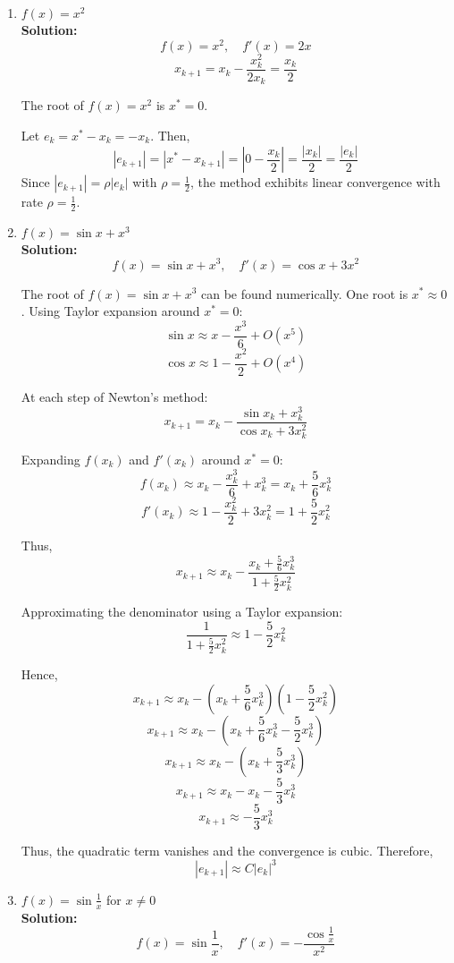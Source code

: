 \documentclass[11pt,onecolumn]{article}
\begin{document}
\begin{enumerate}[label=(\alph*)]
\item $f(x) = x^2$\\
\textbf{Solution:} 
\[
f(x) = x^2, \quad f'(x) = 2x
\]
\[
x_{k+1} = x_k - \frac{x_k^2}{2x_k} = \frac{x_k}{2}
\]

The root of \( f(x) = x^2 \) is \( x^* = 0 \).

Let \( e_k = x^* - x_k = -x_k \). Then,
\[
|e_{k+1}| = \left| x^* - x_{k+1} \right| = \left| 0 - \frac{x_k}{2} \right| = \frac{|x_k|}{2} = \frac{|e_k|}{2}
\]
Since \( |e_{k+1}| = \rho |e_k| \) with \( \rho = \frac{1}{2} \), the method exhibits linear convergence with rate \( \rho = \frac{1}{2} \).

\item $f(x) = \sin{x} + x^3$ \\
\textbf{Solution:}
\[
f(x) = \sin{x} + x^3, \quad f'(x) = \cos{x} + 3x^2
\]

The root of \( f(x) = \sin{x} + x^3 \) can be found numerically. One root is \( x^* \approx 0 \).
Using Taylor expansion around \( x^* = 0 \):
\[
\sin{x} \approx x - \frac{x^3}{6} + O(x^5)
\]
\[
\cos{x} \approx 1 - \frac{x^2}{2} + O(x^4)
\]

At each step of Newton's method:
\[
x_{k+1} = x_k - \frac{\sin{x_k} + x_k^3}{\cos{x_k} + 3x_k^2}
\]

Expanding \( f(x_k) \) and \( f'(x_k) \) around \( x^* = 0 \):
\[
f(x_k) \approx x_k - \frac{x_k^3}{6} + x_k^3 = x_k + \frac{5}{6} x_k^3
\]
\[
f'(x_k) \approx 1 - \frac{x_k^2}{2} + 3x_k^2 = 1 + \frac{5}{2} x_k^2
\]

Thus,
\[
x_{k+1} \approx x_k - \frac{x_k + \frac{5}{6} x_k^3}{1 + \frac{5}{2} x_k^2}
\]

Approximating the denominator using a Taylor expansion:
\[
\frac{1}{1 + \frac{5}{2} x_k^2} \approx 1 - \frac{5}{2} x_k^2
\]

Hence,
\[
x_{k+1} \approx x_k - \left( x_k + \frac{5}{6} x_k^3 \right) \left( 1 - \frac{5}{2} x_k^2 \right)
\]
\[
x_{k+1} \approx x_k - \left( x_k + \frac{5}{6} x_k^3 - \frac{5}{2} x_k^3 \right)
\]
\[
x_{k+1} \approx x_k - \left( x_k + \frac{5}{3} x_k^3 \right)
\]
\[
x_{k+1} \approx x_k - x_k - \frac{5}{3} x_k^3
\]
\[
x_{k+1} \approx -\frac{5}{3} x_k^3
\]

Thus, the quadratic term vanishes and the convergence is cubic. Therefore,
\[
|e_{k+1}| \approx C |e_k|^3
\]



\item $f(x) = \sin{\frac{1}{x}}$ for $x\neq 0$ \\
\textbf{Solution:}
\[
f(x) = \sin{\frac{1}{x}}, \quad f'(x) = -\frac{\cos{\frac{1}{x}}}{x^2}
\]


\end{enumerate}
\end{document}
